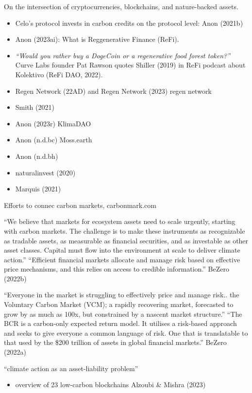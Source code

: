\documentclass[
  letterpaper,
  DIV=11,
  numbers=noendperiod]{scrartcl}
\providecommand{\tightlist}{%
  \setlength{\itemsep}{0pt}\setlength{\parskip}{0pt}}\usepackage{longtable,booktabs,array}
\begin{document}
On the intersection of cryptocurrencies, blockchains, and nature-backed
assets.

\begin{itemize}
\tightlist
\item
  Celo's protocol invests in carbon credits on the protocol level: Anon
  (2021b)
\item
  Anon (2023ai): What is Reggenerative Finance (ReFi).
\item
  \emph{``Would you rather buy a DogeCoin or a regenerative food forest
  token?''} Curve Labs founder Pat Rawson quotes Shiller (2019) in ReFi
  podcast about Kolektivo (ReFi DAO, 2022).
\item
  Regen Network (22AD) and Regen Network (2023) regen network
\item
  Smith (2021)
\item
  Anon (2023r) KlimaDAO
\item
  Anon (n.d.bc) Moss.earth
\item
  Anon (n.d.bh)
\item
  naturalinvest (2020)
\item
  Marquis (2021)
\end{itemize}

Efforts to connec carbon markets, carbonmark.com

``We believe that markets for ecosystem assets need to scale urgently,
starting with carbon markets. The challenge is to make these instruments
as recognizable as tradable assets, as measurable as financial
securities, and as investable as other asset classes. Capital must flow
into the environment at scale to deliver climate action.'' ``Efficient
financial markets allocate and manage risk based on effective price
mechanisms, and this relies on access to credible information.'' BeZero
(2022b)

``Everyone in the market is struggling to effectively price and manage
risk.. the Voluntary Carbon Market (VCM); a rapidly recovering market,
forecasted to grow by as much as 100x, but constrained by a nascent
market structure.'' ``The BCR is a carbon-only expected return model. It
utilises a risk-based approach and seeks to give everyone a common
language of risk. One that is translatable to that used by the \$200
trillion of assets in global financial markets.'' BeZero (2022a)

``climate action as an asset-liability problem''

\begin{itemize}
\tightlist
\item
  overview of 23 low-carbon blockchains Alzoubi \& Mishra (2023)
\end{itemize}
\end{document}
